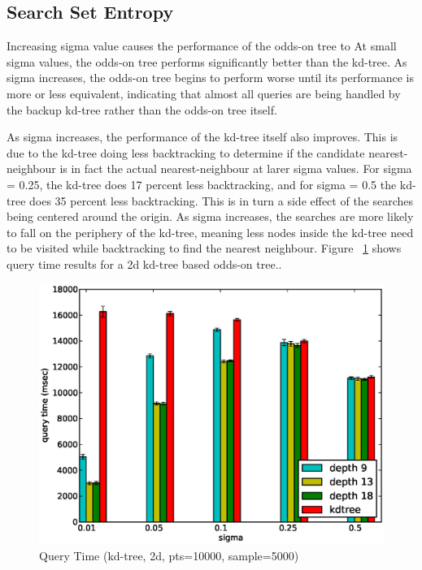 \documentclass[mcs]{scsthesis}
\begin{document}
\subsection{Search Set Entropy}

Increasing sigma value causes the performance of the odds-on tree to
At small sigma values, the odds-on tree performs significantly better than
the kd-tree. As sigma increases, the odds-on tree begins to perform worse
until its performance is more or less equivalent, indicating that almost
all queries are being handled by the backup kd-tree rather than the odds-on
tree itself.

As sigma increases, the performance of the kd-tree itself also improves.
This is due to the kd-tree doing less backtracking to determine if the
candidate nearest-neighbour is in fact the actual nearest-neighbour at
larer sigma values. For sigma = 0.25, the kd-tree does 17 percent less
backtracking, and for sigma = 0.5 the kd-tree does 35 percent less
backtracking. This is in turn a side effect of the searches being centered
around the origin. As sigma increases, the searches are more likely to
fall on the periphery of the kd-tree, meaning less nodes inside the
kd-tree need to be visited while backtracking to find the nearest
neighbour. Figure ~\ref{fig:sigma_qtime} shows query time results for a 2d
kd-tree based odds-on tree..

\begin{figure}
\begin{center}
\includegraphics[scale=0.5]{diagrams/2d_pts10000_sample5000_qtime.eps}
\caption{Query Time (kd-tree, 2d, pts=10000, sample=5000)}
\label{fig:sigma_qtime}
\end{center}
\end{figure}
\end{document}
